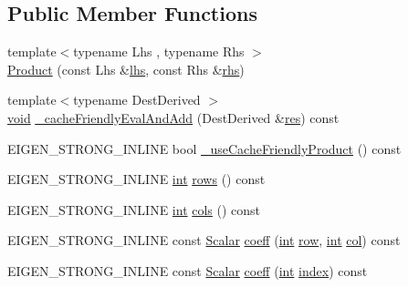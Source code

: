 \subsection*{Public Member Functions}
\begin{DoxyCompactItemize}
\item 
{\footnotesize template$<$typename Lhs , typename Rhs $>$ }\\\hyperlink{class_product_a5f94f1a30ba777d17c66ad74a9fb5016}{Product} (const Lhs \&\hyperlink{class_product_ac87bd6121c704869861f4535a64de124}{lhs}, const Rhs \&\hyperlink{class_product_ad8b3e57239117bf53d6a93283cc72428}{rhs})
\item 
{\footnotesize template$<$typename Dest\-Derived $>$ }\\\hyperlink{group___u_a_v_objects_plugin_ga444cf2ff3f0ecbe028adce838d373f5c}{void} \hyperlink{class_product_a008bf720657115baf420af2f6128bc31}{\-\_\-cache\-Friendly\-Eval\-And\-Add} (Dest\-Derived \&\hyperlink{glext_8h_a1dbb21208b9047cc8031ca9c840d3c2f}{res}) const 
\item 
E\-I\-G\-E\-N\-\_\-\-S\-T\-R\-O\-N\-G\-\_\-\-I\-N\-L\-I\-N\-E bool \hyperlink{class_product_aa3a79c0ebcf1f746a924332d995c2457}{\-\_\-use\-Cache\-Friendly\-Product} () const 
\item 
E\-I\-G\-E\-N\-\_\-\-S\-T\-R\-O\-N\-G\-\_\-\-I\-N\-L\-I\-N\-E \hyperlink{ioapi_8h_a787fa3cf048117ba7123753c1e74fcd6}{int} \hyperlink{class_product_a64aac4e527632938d19f8fa8d5d77488}{rows} () const 
\item 
E\-I\-G\-E\-N\-\_\-\-S\-T\-R\-O\-N\-G\-\_\-\-I\-N\-L\-I\-N\-E \hyperlink{ioapi_8h_a787fa3cf048117ba7123753c1e74fcd6}{int} \hyperlink{class_product_a42cb9c10db6babdcde6131137723a941}{cols} () const 
\item 
E\-I\-G\-E\-N\-\_\-\-S\-T\-R\-O\-N\-G\-\_\-\-I\-N\-L\-I\-N\-E const \hyperlink{class_matrix_base_a625df8339dc2d816cbc0fd66e7dadaf5}{Scalar} \hyperlink{class_product_a88ecda91816a3674d28108e405844dc8}{coeff} (\hyperlink{ioapi_8h_a787fa3cf048117ba7123753c1e74fcd6}{int} \hyperlink{glext_8h_a11b277b422822f784ee248b43eee3e1e}{row}, \hyperlink{ioapi_8h_a787fa3cf048117ba7123753c1e74fcd6}{int} \hyperlink{class_matrix_base_ae3c94b0f25b4273c7a8125169bdf60e0}{col}) const 
\item 
E\-I\-G\-E\-N\-\_\-\-S\-T\-R\-O\-N\-G\-\_\-\-I\-N\-L\-I\-N\-E const \hyperlink{class_matrix_base_a625df8339dc2d816cbc0fd66e7dadaf5}{Scalar} \hyperlink{class_product_ab5ba5ae93b975cf4fc35e58181a0743c}{coeff} (\hyperlink{ioapi_8h_a787fa3cf048117ba7123753c1e74fcd6}{int} \hyperlink{glext_8h_ab47dd9958bcadea08866b42bf358e95e}{index}) const 

\end{DoxyCompactItemize}
